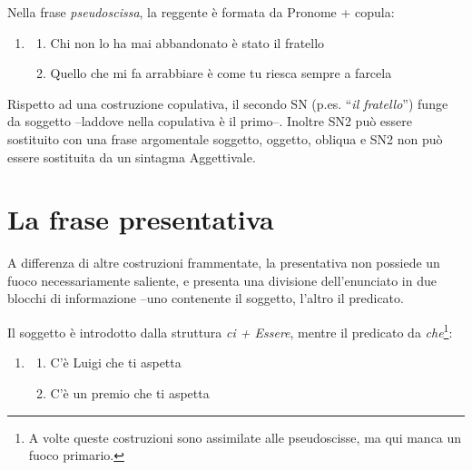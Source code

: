 \documentclass[
  a4paper,
  twoside,
  11pt,
  chapterprefix=false,
  bibliography=totocnumbered,
  listof=flat]{scrbook}
\providecommand{\tightlist}{%
  \setlength{\itemsep}{0pt}\setlength{\parskip}{0pt}}
\begin{document}
Nella frase \emph{pseudoscissa}, la reggente è formata da Pronome + copula:

\begin{enumerate}
\def\labelenumi{(\arabic{enumi})}
\setcounter{enumi}{179}
\item
  \begin{enumerate}
  \def\labelenumii{\alph{enumii}.}
  \tightlist
  \item
    Chi non lo ha mai abbandonato è stato il fratello
  \item
    Quello che mi fa arrabbiare è come tu riesca sempre a farcela
  \end{enumerate}
\end{enumerate}

Rispetto ad una costruzione copulativa, il secondo SN (p.es. \enquote{\emph{il fratello}}) funge da soggetto --laddove nella copulativa è il primo--. Inoltre SN2 può essere sostituito con una frase argomentale soggetto, oggetto, obliqua e SN2 non può essere sostituita da un sintagma Aggettivale.

\hypertarget{la-frase-presentativa}{%
\section{La frase presentativa}\label{la-frase-presentativa}}

A differenza di altre costruzioni frammentate, la presentativa non possiede un fuoco necessariamente saliente, e presenta una divisione dell'enunciato in due blocchi di informazione --uno contenente il soggetto, l'altro il predicato.

Il soggetto è introdotto dalla struttura \emph{ci + Essere}, mentre il predicato da \emph{che}\footnote{A volte queste costruzioni sono assimilate alle pseudoscisse, ma qui manca un fuoco primario.}:

\begin{enumerate}
\def\labelenumi{(\arabic{enumi})}
\setcounter{enumi}{180}
\item
  \begin{enumerate}
  \def\labelenumii{\alph{enumii}.}
  \tightlist
  \item
    C'è Luigi che ti aspetta
  \item
    C'è un premio che ti aspetta
  \end{enumerate}
\end{enumerate}

\backmatter
  
\end{document}
